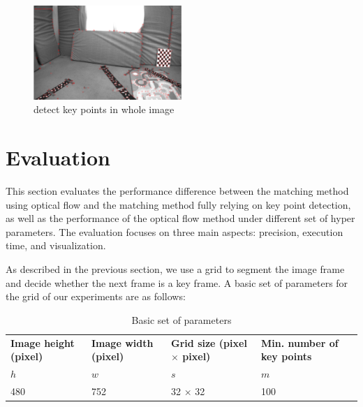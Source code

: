 \documentclass[conference]{IEEEtran}
\begin{document}
\begin{figure}[h!]

\centering
\includegraphics[width=0.5\textwidth]{img/whole_image_keypoints_detection_129.png}

\caption{detect key points in whole image}
\label{fig:whole image}
\end{figure}



\section{Evaluation}
This section evaluates the performance difference between the matching method using optical flow and the matching method fully relying on key point detection, as well as the performance of the optical flow method under different set of hyper parameters. The evaluation focuses on three main aspects: precision, execution time, and visualization.

As described in the previous section, we use a grid to segment the image frame and decide whether the next frame is a key frame. A basic set of parameters for the grid of our experiments are as follows:


\begin{table}[h!]
	\begin{center}
		\caption{Basic set of parameters}
		\label{tab:basicset}
		\begin{tabular}{llll} %
			\textbf{Image height (pixel)} & \textbf{Image width (pixel)} & \textbf{Grid size (pixel $\times$ pixel)}& \textbf{Min. number of key points}\\
			$h$ & $w$ & $s$ & $m$ \\
			\hline
			480 & 752 & 32 $\times$ 32 & 100 \\
	
		\end{tabular}
	\end{center}
\end{table}
\end{document}
